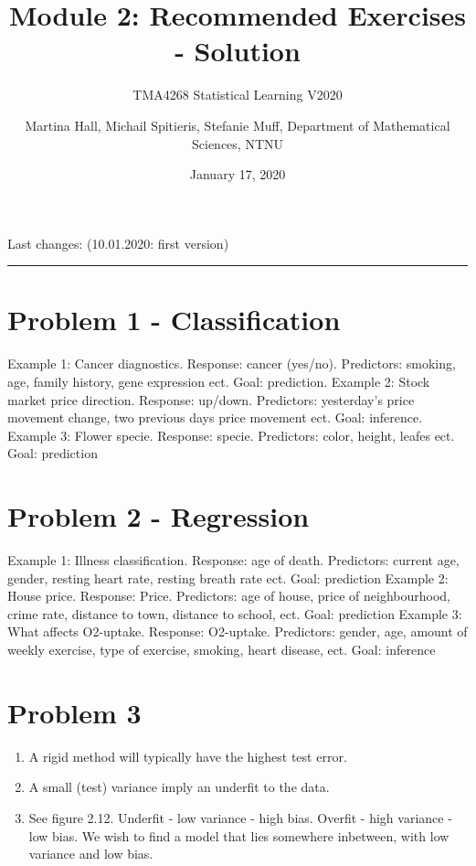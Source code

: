 \documentclass[]{article}
\title{Module 2: Recommended Exercises - Solution}
\subtitle{TMA4268 Statistical Learning V2020}
\author{Martina Hall, Michail Spitieris, Stefanie Muff, Department of
Mathematical Sciences, NTNU}
\date{January 17, 2020}
\providecommand{\tightlist}{%
  \setlength{\itemsep}{0pt}\setlength{\parskip}{0pt}}
\begin{document}
\maketitle

Last changes: (10.01.2020: first version)

\begin{center}\rule{0.5\linewidth}{\linethickness}\end{center}

\section{Problem 1 - Classification}\label{problem-1---classification}

Example 1: Cancer diagnostics. Response: cancer (yes/no). Predictors:
smoking, age, family history, gene expression ect. Goal: prediction.
Example 2: Stock market price direction. Response: up/down. Predictors:
yesterday's price movement change, two previous days price movement ect.
Goal: inference. Example 3: Flower specie. Response: specie. Predictors:
color, height, leafes ect. Goal: prediction

\section{Problem 2 - Regression}\label{problem-2---regression}

Example 1: Illness classification. Response: age of death. Predictors:
current age, gender, resting heart rate, resting breath rate ect. Goal:
prediction Example 2: House price. Response: Price. Predictors: age of
house, price of neighbourhood, crime rate, distance to town, distance to
school, ect. Goal: prediction Example 3: What affects O2-uptake.
Response: O2-uptake. Predictors: gender, age, amount of weekly exercise,
type of exercise, smoking, heart disease, ect. Goal: inference

\section{Problem 3}\label{problem-3}

\begin{enumerate}
\def\labelenumi{\alph{enumi})}
\tightlist
\item
  A rigid method will typically have the highest test error.
\item
  A small (test) variance imply an underfit to the data.
\item
  See figure 2.12. Underfit - low variance - high bias. Overfit - high
  variance - low bias. We wish to find a model that lies somewhere
  inbetween, with low variance and low bias.
\end{enumerate}
\end{document}
